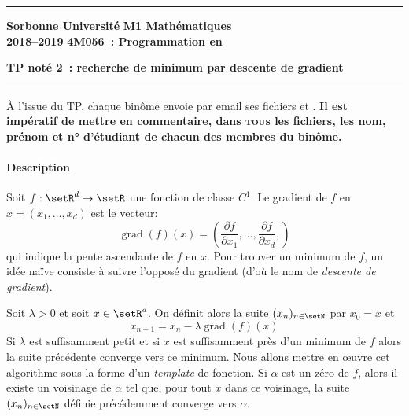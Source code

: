 \documentclass[10pt]{article}
\DeclareMathOperator{\grad}{grad}
\begin{document}
\hrule \vspace*{5pt} \noindent 
\textbf{Sorbonne Université} \hfill \textbf{M1 Mathématiques}\\
\textbf{2018--2019} \hfill \textbf{4M056~: Programmation en \CPP}
\begin{center}
\textbf{TP not\'e 2~: recherche de minimum par descente de gradient}
\end{center}
\hrule \vspace*{20pt}

À l'issue du TP, chaque binôme envoie par email ses fichiers  et .
\textbf{Il est imp\'eratif de mettre en commentaire, dans
\textsc{tous} les fichiers, les nom, pr\'enom et n° d'\'etudiant de chacun des
membres du bin\^ome.}

\paragraph{Description}
Soit $f:\setR^d\to\setR$ une fonction de classe $C^1$. Le gradient de $f$ en $x=(x_1,\ldots,x_d)$ est le vecteur:
\[
\grad(f)(x) = \left(
\frac{\partial f}{\partial x_1},\ldots, \frac{\partial f}{\partial x_d},
\right)
\]
qui indique la pente ascendante de $f$ en $x$. Pour trouver un minimum de $f$, un idée naïve consiste à suivre l'opposé du gradient (d'où le nom de \emph{descente de gradient}). 

Soit $\lambda>0$ et soit $x\in\setR^d$. On définit alors la suite $(x_n)_{n\in\setN}$ par $x_0=x$ et \[
x_{n+1} = x_n - \lambda \grad(f)(x)
\]
Si $\lambda$ est suffisamment petit et si $x$ est suffisamment près d'un minimum de $f$ alors la suite précédente converge vers ce minimum. Nous allons mettre en \oe{}uvre cet algorithme sous la forme d'un \emph{template} de fonction.
Si $\alpha$ est un zéro de $f$, alors il existe un voisinage de $\alpha$ tel que, pour tout $x$ dans ce voisinage, la suite $(x_n)_{n\in\setN}$ définie précédemment converge vers $\alpha$.
\end{document}
